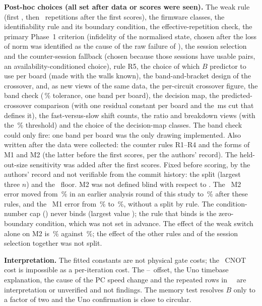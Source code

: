 \textbf{Post-hoc choices (all set after data or scores were seen).} The weak rule (first \WeakFirst, then \WeakMin\ repetitions after the first scores), the firmware classes, the identifiability rule and its boundary condition, the effective-repetition check, the primary Phase~1 criterion (infidelity of the normalised state, chosen after the loss of norm was identified as the cause of the raw failure of \grover), the session selection and the counter-session fallback (chosen because those sessions have usable pairs, an availability-conditioned choice), rule R5, the choice of which $B$ predictor to use per board (made with the walls known), the band-and-bracket design of the crossover, and, as new views of the same data, the per-circuit crossover figure, the band check (\BandTolPct\,\% tolerance, one band per board), the decision map, the predicted-crossover comparison (with one residual constant per board and the \SimSmallMs\,ms cut that defines it), the fast-versus-slow shift counts, the ratio and breakdown views (with the \BreakPcShare\,\% threshold) and the choice of the decision-map classes. The band check could only fire: one band per board was the only drawing implemented. Also written after the data were collected: the counter rules R1--R4 and the forms of M1 and M2 (the latter before the first scores, per the authors' record). The held-out-size sensitivity was added after the first scores. Fixed before scoring, by the authors' record and not verifiable from the commit history: the split (largest three $n$) and the \ModelFloorUs\us\ floor. M2 was not defined blind with respect to \grover. The \espA\ M2 error moved from \PrevMtwoEspLo\,\% in an earlier analysis round of this study to \MapeTwoEspLo\,\% after these rules, and the \espB\ M1 error from \PrevMoneEspHi\,\% to \MapeOneEspHi\,\%, without a split by rule. The condition-number cap (\CondCap) never binds (largest value \CondMaxTwo); the rule that binds is the zero-boundary condition, which was not set in advance. The effect of the weak switch alone on M2 is \WeakSwitchWithout\,\% against \WeakSwitchWith\,\%; the effect of the other rules and of the session selection together was not split.

\textbf{Interpretation.} The fitted constants are not physical gate costs; the \espA\ CNOT cost is impossible as a per-iteration cost. The \SelfTestLo--\SelfTestHi\us\ offset, the Uno timebase explanation, the cause of the PC speed change and the repeated rows in \espB\ \grover\ are interpretation or unverified and not findings. The memory test resolves $B$ only to a factor of two and the Uno confirmation is close to circular.
